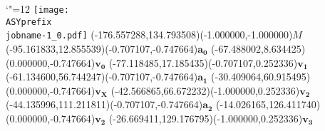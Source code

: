 \setlength{\unitlength}{1pt}
\makeatletter%
\let\ASYencoding\f@encoding%
\let\ASYfamily\f@family%
\let\ASYseries\f@series%
\let\ASYshape\f@shape%
\makeatother%
{\catcode`"=12%
\texttt{[image: \\ASYprefix\\jobname-1\_0.pdf]}%
}%
\color{ASYcolor}
\fontsize{12.000000}{14.400000}\selectfont
\usefont{\ASYencoding}{\ASYfamily}{\ASYseries}{\ASYshape}%
\ASYalign(-176.557288,134.793508)(-1.000000,-1.000000){$M$}%
\color{ASYcolor}
\fontsize{12.000000}{14.400000}\selectfont
\ASYalign(-95.161833,12.855539)(-0.707107,-0.747664){$\mathbf{a_0}$}%
\color{ASYcolor}
\fontsize{12.000000}{14.400000}\selectfont
\ASYalign(-67.488002,8.634425)(0.000000,-0.747664){$\mathbf{v_0}$}%
\color{ASYcolor}
\fontsize{12.000000}{14.400000}\selectfont
\ASYalign(-77.118485,17.185435)(-0.707107,0.252336){$\mathbf{v_1}$}%
\color{ASYcolor}
\fontsize{12.000000}{14.400000}\selectfont
\ASYalign(-61.134600,56.744247)(-0.707107,-0.747664){$\mathbf{a_1}$}%
\color{ASYcolor}
\fontsize{12.000000}{14.400000}\selectfont
\ASYalign(-30.409064,60.915495)(0.000000,-0.747664){$\mathbf{v_X}$}%
\color{ASYcolor}
\fontsize{12.000000}{14.400000}\selectfont
\ASYalign(-42.566865,66.672232)(-1.000000,0.252336){$\mathbf{v_2}$}%
\color{ASYcolor}
\fontsize{12.000000}{14.400000}\selectfont
\ASYalign(-44.135996,111.211811)(-0.707107,-0.747664){$\mathbf{a_2}$}%
\color{ASYcolor}
\fontsize{12.000000}{14.400000}\selectfont
\ASYalign(-14.026165,126.411740)(0.000000,-0.747664){$\mathbf{v_2}$}%
\color{ASYcolor}
\fontsize{12.000000}{14.400000}\selectfont
\ASYalign(-26.669411,129.176795)(-1.000000,0.252336){$\mathbf{v_3}$}%
